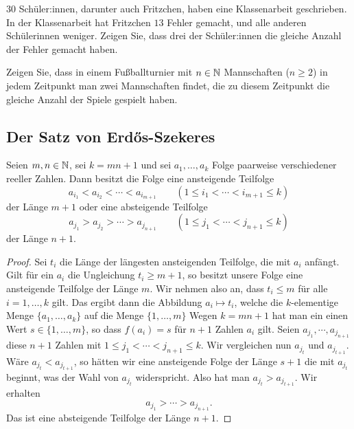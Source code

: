 \begin{aufg}
	$30$ Schüler:innen, darunter auch Fritzchen, haben eine Klassenarbeit geschrieben. In der Klassenarbeit hat Fritzchen $13$ Fehler gemacht, und alle anderen Schülerinnen weniger. Zeigen Sie, dass drei der Schüler:innen die gleiche Anzahl der Fehler gemacht haben. 
\end{aufg}  

\begin{aufg}
	Zeigen Sie, dass in einem Fußballturnier mit $n \in \mathbb{N}$ Mannschaften ($n \ge 2$) in jedem Zeitpunkt man zwei Mannschaften findet, die zu diesem Zeitpunkt die gleiche Anzahl der Spiele gespielt haben. 
\end{aufg} 

\subsection{Der Satz von Erd\H{os}-Szekeres}


\begin{thm} 
	Seien $m, n \in \mathbb{N}$, sei $k=mn+1$ und sei $a_1,\ldots,a_k$ Folge paarweise verschiedener reeller Zahlen. Dann besitzt die Folge eine ansteigende Teilfolge 
	\[
			a_{i_1}  < a_{i_2} < \cdots < a_{i_{m+1}} \qquad (1 \le i_1 < \cdots < i_{m+1} \le k)
	\]
	der Länge $m+1$ oder eine absteigende Teilfolge 
	\[
		 a_{j_1} > a_{j_2} > \cdots > a_{j_{n+1}} \qquad (1 \le j_1 < \cdots < j_{n+1} \le k)
	\]
	der  Länge $n+1$. 
\end{thm} 
\begin{proof}
	Sei $t_i$ die Länge der längesten ansteigenden Teilfolge, die mit $a_i$ anfängt. Gilt für ein $a_i$ die Ungleichung $t_i \ge m+1$, so besitzt unsere Folge eine ansteigende Teilfolge der Länge $m$. Wir nehmen also an, dass $t_i \le m$ für alle $i=1,\ldots, k$ gilt. Das ergibt dann die Abbildung $a_i \mapsto t_i$, welche die $k$-elementige Menge $\{a_1,\ldots,a_k\}$ auf die Menge $\{1,\ldots,m\}$  Wegen $k=mn+1$ hat man ein einen Wert $s \in \{1,\ldots,m\}$, so dass $f(a_i) = s$ für $n+1$ Zahlen $a_i$ gilt. Seien $a_{j_1}, \cdots ,  a_{j_{n+1}}$ diese $n+1$ Zahlen mit $1 \le j_1 < \cdots < j_{n+1} \le k$. Wir vergleichen nun $a_{j_t}$ und $a_{j_{t+1}}$. Wäre $a_{j_t} < a_{j_{t+1}}$, so hätten wir eine ansteigende Folge der Länge $s+1$ die mit $a_{j_t}$ beginnt, was der Wahl von $a_{j_t}$ widerspricht. Also hat man $a_{j_t} > a_{j_{t+1}}$. Wir erhalten 
	\[
		a_{j_1} > \cdots > a_{j_{n+1}}.
	\]
	Das ist eine absteigende Teilfolge der Länge $n+1$. 
\end{proof} 


